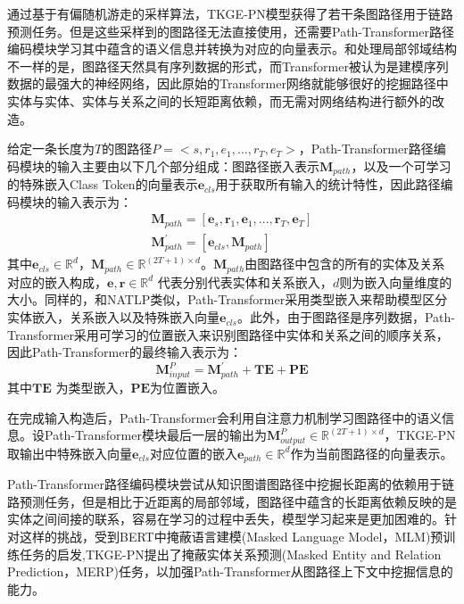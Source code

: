 通过基于有偏随机游走的采样算法，TKGE-PN模型获得了若干条图路径用于链路预测任务。但是这些采样到的图路径无法直接使用，还需要Path-Transformer路径编码模块学习其中蕴含的语义信息并转换为对应的向量表示。和处理局部邻域结构不一样的是，图路径天然具有序列数据的形式，而Transformer被认为是建模序列数据的最强大的神经网络，因此原始的Transformer网络就能够很好的挖掘路径中实体与实体、实体与关系之间的长短距离依赖，而无需对网络结构进行额外的改造。

给定一条长度为$T$的图路径$P=<s,r_1,e_1,...,r_T,e_T>$，Path-Transformer路径编码模块的输入主要由以下几个部分组成：图路径嵌入表示$\mathbf{M}_{path} $，以及一个可学习的特殊嵌入Class Token的向量表示$\mathbf{e}_{cls}$用于获取所有输入的统计特性，因此路径编码模块的输入表示为：
\begin{gather}
  \mathbf{M}_{path} = [\boldsymbol{e}_s,\boldsymbol{r}_1,\boldsymbol{e}_1,...,\boldsymbol{r}_T,\boldsymbol{e}_T]\\
  \mathbf{M}_{path}^{\prime} = [\boldsymbol{e}_{cls},\mathbf{M}_{path}]
\end{gather}
其中$\boldsymbol{e}_{cls}\in\mathbb{R}^d$，$\mathbf{M}_{path} \in \mathbb{R}^{(2T+1)\times d}$。$\mathbf{M}_{path}$由图路径中包含的所有的实体及关系对应的嵌入构成，$\boldsymbol{e},\boldsymbol{r} \in \mathbb{R}^d$ 代表分别代表实体和关系嵌入，$d$则为嵌入向量维度的大小。同样的，和NATLP类似，Path-Transformer采用类型嵌入来帮助模型区分实体嵌入，关系嵌入以及特殊嵌入向量$\boldsymbol{e}_{cls}$。此外，由于图路径是序列数据，Path-Transformer采用可学习的位置嵌入来识别图路径中实体和关系之间的顺序关系，因此Path-Transformer的最终输入表示为：
\begin{equation}
  \mathbf{M}_{input}^{P} = \mathbf{M}_{path}^{\prime}+\mathbf{TE} + \mathbf{PE}
\end{equation}
其中$\mathbf{TE}$ 为类型嵌入，$\mathbf{PE}$为位置嵌入。

在完成输入构造后，Path-Transformer会利用自注意力机制学习图路径中的语义信息。设Path-Transformer模块最后一层的输出为$\mathbf{M}_{output}^{P}\in\mathbb{R}^{(2T+1)\times d}$，TKGE-PN取输出中特殊嵌入向量$\boldsymbol{e}_{cls}$对应位置的嵌入$\boldsymbol{e}_{path}\in\mathbb{R}^d$作为当前图路径的向量表示。

Path-Transformer路径编码模块尝试从知识图谱图路径中挖掘长距离的依赖用于链路预测任务，但是相比于近距离的局部邻域，图路径中蕴含的长距离依赖反映的是实体之间间接的联系，容易在学习的过程中丢失，模型学习起来是更加困难的。针对这样的挑战，受到BERT中掩蔽语言建模(Masked Language Model，MLM)预训练任务的启发,TKGE-PN提出了掩蔽实体关系预测(Masked Entity and Relation Prediction，MERP)任务，以加强Path-Transformer从图路径上下文中挖掘信息的能力。

